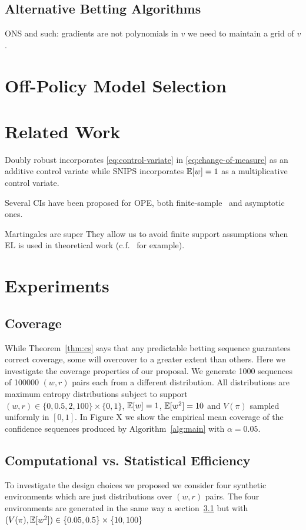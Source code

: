 \subsection{Alternative Betting Algorithms}
ONS and such: gradients are not polynomials in $v$
we need to maintain a grid of $v$.

\section{Off-Policy Model Selection}

\section{Related Work}
\label{sec:related}
Doubly robust \cite{RnR, dudik2011doubly} incorporates \eqref{eq:control-variate}
in \eqref{eq:change-of-measure} as an additive control variate
while SNIPS \cite{swaminathan2015self} incorporates $\mathbb{E}[w]=1$ 
as a multiplicative control variate. 

Several CIs have been proposed for OPE, both 
finite-sample~\cite{thomas2015high} and 
asymptotic~\cite{li2015counterfactual,karampatziakis2019empirical} ones.

Martingales are super \cite{ramdas2020admissible} 
They allow us to avoid finite support assumptions
when EL is used in theoretical work
(c.f.~\cite{cappe2013kullback} for example).  
\section{Experiments}

\subsection{Coverage} \label{sec:coverage}
While Theorem~\ref{thm:cs} says that any predictable betting sequence
guarantees correct coverage, some will overcover to a greater extent than others. Here we investigate the coverage properties of our 
proposal. We generate 1000 sequences of 100000 $(w,r)$ pairs 
each from a different distribution. All distributions are 
maximum entropy distributions subject to
support $(w,r) \in \{0, 0.5, 2, 100\} \times \{0,1\}$,
$\mathbb{E}[w]=1$, $\mathbb{E}[w^2]=10$ and $V(\pi)$ sampled uniformly 
in $[0,1]$. In Figure X we show the 
empirical mean coverage of the confidence sequences produced 
by Algorithm~\ref{alg:main} with $\alpha=0.05$. 

\subsection{Computational vs. Statistical Efficiency}
To investigate the design choices we proposed we consider
four synthetic environments which are just 
distributions over $(w,r)$ pairs. The four environments
are generated in the same way a section~\ref{sec:coverage}
but with $(V(\pi),\mathbb{E}[w^2]) \in \{0.05, 0.5\} \times \{10, 100\}$

